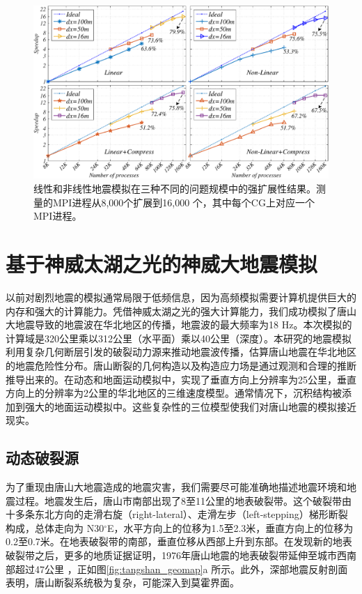 \documentclass[degree=doctor]{thuthesis}
\begin{document}
\begin{figure}[ht]
\centering
\includegraphics[width=1.0\columnwidth]{strong_scaling.pdf}
\caption{线性和非线性地震模拟在三种不同的问题规模中的强扩展性结果。测量的MPI进程从8,000个扩展到16,000 个，其中每个CG上对应一个MPI进程。}
\label{fig:strong-scaling}
\end{figure}

\section{基于神威太湖之光的神威大地震模拟}

以前对剧烈地震的模拟通常局限于低频信息，因为高频模拟需要计算机提供巨大的内存和强大的计算能力。凭借神威太湖之光的强大计算能力，我们成功模拟了唐山大地震导致的地震波在华北地区的传播，地震波的最大频率为18 Hz。本次模拟的计算域是320公里乘以312公里（水平面）乘以40公里（深度）。本研究的地震模拟利用复杂几何断层引发的破裂动力源来推动地震波传播，估算唐山地震在华北地区的地震危险性分布。唐山断裂的几何构造以及构造应力场是通过观测和合理的推断推导出来的。在动态和地面运动模拟中，实现了垂直方向上分辨率为25公里，垂直方向上的分辨率为2公里的华北地区的三维速度模型。通常情况下，沉积结构被添加到强大的地面运动模拟中。这些复杂性的三位模型使我们对唐山地震的模拟接近现实。

\subsection{动态破裂源}

为了重现由唐山大地震造成的地震灾害，我们需要尽可能准确地描述地震环境和地震过程。地震发生后，唐山市南部出现了8至11公里的地表破裂带。这个破裂带由十多条东北方向的走滑右旋（right-lateral）、走滑左步（left-stepping）梯形断裂构成，总体走向为 N30$^\circ$E，水平方向上的位移为1.5至2.3米，垂直方向上的位移为0.2至0.7米。在地表破裂带的南部，垂直位移从西部上升到东部。在发现新的地表破裂带\citep {Qiu_discovery_2005}之后，更多的地质证据证明，1976年唐山地震的地表破裂带延伸至城市西南部超过47公里 \citep{guo_new_2011}，正如图\ref{fig:tangshan_geomap}a 所示。此外，深部地震反射剖面表明，唐山断裂系统极为复杂，可能深入到莫霍界面\citep{liu_seismogenic_2007}。
\end{document}
